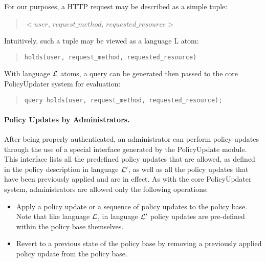 \documentclass[11pt]{llncs}
\begin{document}
        For our purposes, a HTTP request may be described as a simple tuple:

        \begin{quote}
          $<$$user$, $request\_method$, $requested\_resource$$>$
        \end{quote}

        Intuitively, such a tuple may be viewed as a language {\cal L} atom:

        \begin{quote}
        \begin{verbatim}holds(user, request_method, requested_resource)\end{verbatim}
        \end{quote}

        With language ${\cal L}$ atoms, a query can be generated then passed to
        the core PolicyUpdater system for evaluation:

        \begin{quote}
          \begin{verbatim}query holds(user, request_method, requested_resource);\end{verbatim}
        \end{quote}

      \paragraph{\bf Policy Updates by Administrators.}

        After being properly authenticated, an administrator can perform policy
        updates through the use of a special interface generated by the
        PolicyUpdate module. This interface lists all the predefined policy
        updates that are allowed, as defined in the policy description in 
        language ${\cal L'}$, as well as all the policy updates that have been
        previously applied and are in effect. As with the core PolicyUpdater
        system, administrators are allowed only the following operations:

        \begin{itemize}
          \item
            Apply a policy update or a sequence of policy updates to the policy
            base. Note that like language ${\cal L}$, in language ${\cal L'}$
            policy updates are pre-defined within the policy base themselves.
          \vspace{1mm}
          \item
            Revert to a previous state of the policy base by removing a 
            previously applied policy update from the policy base. 
        \end{itemize}
\end{document}
